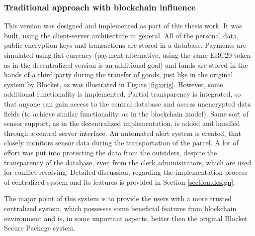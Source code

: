 \subsubsection{Traditional approach with blockchain influence} \label{section:centralizedapproach}
This version was designed and implemented as part of this thesis work. It was built, using the client-server architecture in general. All of the personal data, public encryption keys and transactions are stored in a database. Payments are simulated using fiat currency (payment alternative, using the same ERC20 token as in the decentralized version is an additional goal) and funds are stored in the hands of a third party during the transfer of goods, just like in the original system by Blocket, as was illustrated in Figure \ref{fig:orig}. However, some additional functionality is implemented. Partial transparency is integrated, so that anyone can gain access to the central database and access unencrypted data fields (to achieve similar functionality, as in the blockchain model). Same sort of sensor support, as in the decentralized implementation, is added and handled through a central server interface. An automated alert system is created, that closely monitors sensor data during the transportation of the parcel. A lot of effort was put into protecting the data from the outsiders, despite the transparency of the database, even from the clerk administrators, which are used for conflict resolving. Detailed discussion, regarding the implementation process of centralized system and its features is provided in Section \ref{section:design}.

The major point of this system is to provide the users with a more trusted centralized system, which possesses some beneficial features from blockchain environment and is, in some important aspects, better then the original Blocket Secure Package system.